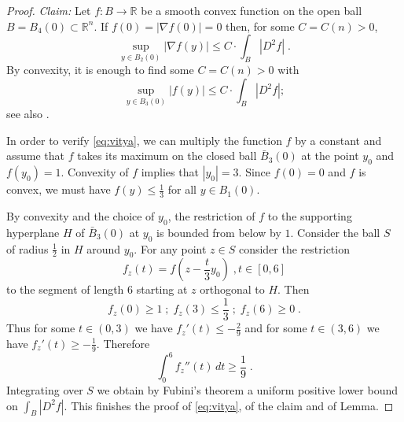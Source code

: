 \documentclass[12pt,leqno,intlimits]{amsart}
\numberwithin{equation}{section}
\theoremstyle{definition}
\theoremstyle{remark}
\newcommand{\R}{\mathbb{R}}
\begin{document}
\begin{proof}
\emph{Claim:} Let $f:B \to \R$ be a smooth convex function on the open ball $B=B_4 (0)\subset \R^n$.
If $f(0)=|\nabla f(0)| =0$ then, for some $C=C(n)>0$,
$$\sup_{y\in B_2 (0)} |\nabla f (y)| \leq C\cdot \int _{B} |D^2f| \;.$$
By convexity, it is enough to find some $C=C(n)>0$ with
\begin{equation}  \label{eq:vitya}
\sup _{y\in B_3 (0) }| f(y)| \leq C \cdot \int _{B} |D^2f|;
 \end{equation}
see also \cite[Theorem 6.7]{Evans}.

In order to verify \eqref{eq:vitya}, we can multiply the function $f$ by a constant and assume that
$f$ takes its maximum on the closed ball $\bar B_3 (0)$ at the point $y_0$ and $f(y_0)=1$.
Convexity of $f$ implies that $|y_0|=3$.
Since $f(0)=0$ and  $f$ is convex, we must have $f(y)\leq \frac 1 3$ for all $y\in B_1(0)$.


 By convexity and the choice of $y_0$, the restriction of $f$ to the supporting  hyperplane $H$ of $\bar B_3(0)$ at $y_0$ is bounded from below by $1$. Consider the ball  $S$ of radius $\frac 1 2$ in $H$ around $y_0$. For any point $z\in S$ consider the restriction
 $$f_z  (t)= f(z- \frac t 3 y_0 ) \;, t\in [0,6]$$  to the segment of length $6$   starting at $z$ orthogonal to $H$.
 Then $$f_z(0)\geq 1 \; ; \; f_z (3)\leq \frac 1 3 \; ; \; f_z (6) \geq 0 \;.$$
 Thus for some $t\in (0,3)$ we have $f_z'(t) \leq  -\frac  2 9$ and for some $t\in (3,6)$ we have $f_z'(t) \geq  - \frac  1 9$.
 Therefore
 $$\int _0 ^6 f_z'' (t)\, dt  \geq \frac 1 9 \; .$$
 Integrating over $S$ we obtain by Fubini's  theorem a uniform positive lower bound on $\int _{B} |D^2f|$.
 This finishes the proof of \eqref{eq:vitya}, of the claim and of Lemma.
\end{proof}
\end{document}
